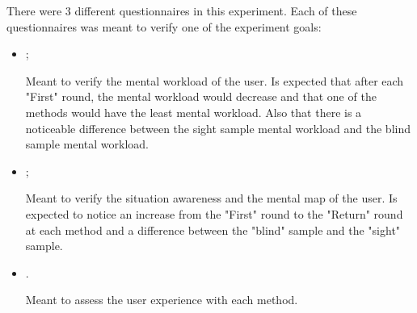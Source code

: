 There were 3 different questionnaires in this experiment. Each of these questionnaires was meant to verify one of the experiment goals:

\begin{itemize}
    \item {};
    
        Meant to verify the mental workload of the user. Is expected that after each "First" round, the mental workload would decrease and that one of the methods would have the least mental workload. Also that there is a noticeable difference between the sight sample mental workload and the blind sample mental workload.

    \item {};
    
        Meant to verify the situation awareness and the mental map of the user. Is expected to notice an increase from the "First" round to the "Return" round at each method and a difference between the "blind" sample and the "sight" sample.

    \item {}.

        Meant to assess the user experience with each method.

\end{itemize}






